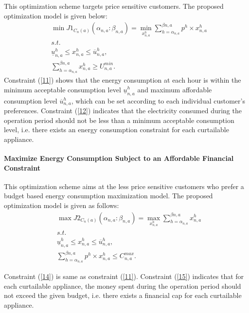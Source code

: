 \documentclass[10pt,journal]{IEEEtran}
\theoremstyle{definition}
\theoremstyle{plain} \newtheorem{theo}{Theorem} \newtheorem{prop}{Proposition}  \newtheorem{lemm}{Lemma}
\begin{document}
This optimization scheme targets price sensitive customers. The proposed optimization model is given below:\vspace{-0.15cm}
\begin{align}
&{\operatorname{\min  }} J1_{C_n(a)}(\alpha_{n,a} \colon \beta_{n,a}) = \underset{x_{n,a}^h} {\operatorname{\min}} \sum _{h=\alpha_{n,a}}^{\beta{n,a}} p^h \times x_{n,a}^h \label{10} \\
&s.t. \nonumber \\
& \underline{u}_{n,a}^h   \leq x_{n,a}^h \leq \overline{u}_{n,a}^h , \label{11}\\
& \sum_{h=\alpha_{n,a}}^{\beta{n,a}} x_{n,a}^h \geq U_{n,a}^{min}. \label{12}
  \end{align}
Constraint (\ref{11}) shows that the energy consumption at each hour is within the minimum acceptable consumption level $\underline{u}_{n,a}^h$  and maximum affordable consumption level $\overline{u}_{n,a}^h$, which can be set according to each individual customer's preferences. Constraint (\ref{12}) indicates that the electricity consumed during the operation period should not be less than a minimum acceptable consumption level, i.e. there exists an energy consumption constraint for each curtailable appliance.

\paragraph{Maximize Energy Consumption Subject to an Affordable Financial Constraint}
This optimization scheme aims at the less price sensitive customers who prefer a budget based energy consumption maximization model. The proposed optimization model is given as follows:\vspace{-0.5cm}
\begin{align}
&{\operatorname{\max  }} J2_{C_n(a)}(\alpha_{n,a} \colon \beta_{n,a}) = \underset{x_{n,a}^h} {\operatorname{\max}} \sum _{h=\alpha_{n,a}}^{\beta{n,a}} x_{n,a}^h  \label{13} \\
&s.t. \nonumber\\
&\underline{u}_{n,a}^h   \leq x_{n,a}^h \leq \overline{u}_{n,a}^h , \label{14}\\
&\sum_{h=\alpha_{n,a}}^{\beta{n,a}} p^{h} \times x_{n,a}^h \leq C_{n,a}^{max}. \label{15}
  \end{align}
   
Constraint (\ref{14}) is same as constraint (\ref{11}). Constraint (\ref{15}) indicates that for each curtailable appliance, the money spent during the operation period should not exceed the given budget, i.e. there exists a financial cap for each curtailable appliance.
 
\end{document}
